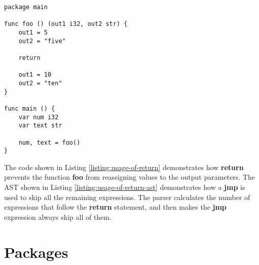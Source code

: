 \documentclass[11pt,fleqn,openany]{book} %
\begin{document}
\begin{lstlisting}[caption={Usage of return},captionpos=b,label={listing:usage-of-return}]
package main

func foo () (out1 i32, out2 str) {
	out1 = 5
    out2 = "five"
    
    return
    
    out1 = 10
    out2 = "ten"
}

func main () {
	var num i32
    var text str
    
    num, text = foo()
}
\end{lstlisting}

The code shown in Listing \ref{listing:usage-of-return} demonstrates how \textbf{return} prevents the function \textbf{foo} from reassigning values to the output parameters. The AST shown in Listing \ref{listing:usage-of-return-ast} demonstrates how a \textbf{jmp} is used to skip all the remaining expressions. The parser calculates the number of expressions that follow the \textbf{return} statement, and then makes the \textbf{jmp} expression always skip all of them.


\chapter{Packages}
\label{chapter:packages}
\end{document}
